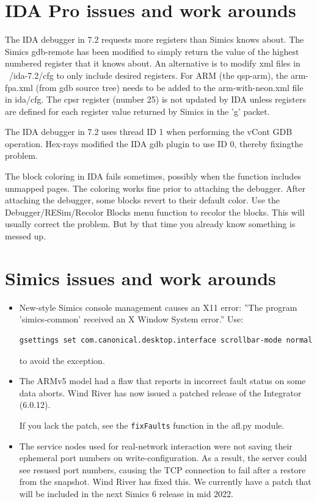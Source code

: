 \documentclass[titlepage]{article}
\begin{document}
\begin{appendices}
\section{IDA Pro issues and work arounds}
The IDA debugger in 7.2 requests more registers than Simics knows about.  The Simics gdb-remote has been modified
to simply return the value of the highest numbered register that it knows about.  An alternative is to modify
xml files in ~/ida-7.2/cfg to only include desired registers.   For ARM (the qsp-arm), the arm-fpa.xml (from gdb source
tree) needs to be added to the arm-with-neon.xml file in ida/cfg.  The cpsr register (number 25) is not updated by IDA
unless registers are defined for each register value returned by Simics in the 'g' packet.

The IDA debugger in 7.2 uses thread ID 1 when performing the vCont GDB operation.  Hex-rays modified the IDA gdb plugin to
use ID 0, thereby fixingthe problem.

The block coloring in IDA fails sometimes, possibly when the function includes unmapped pages.  The coloring works fine prior
to attaching the debugger.  After attaching the debugger, some blocks revert to their default color.  Use the Debugger/RESim/Recolor Blocks
menu function to recolor the blocks. 
This will usually correct the problem.  But by that time you already know something is messed up.

\section{Simics issues and work arounds}
\begin{itemize}
\item New-style Simics console management causes an X11 error: ''The program 'simics-common' received an X Window System error.''
Use:
\begin{verbatim}
gsettings set com.canonical.desktop.interface scrollbar-mode normal
\end{verbatim}
\noindent to avoid the exception.
\item The ARMv5 model had a flaw that reports in incorrect fault status on some data aborts.  Wind River has now issued a patched release
of the Integrator (6.0.12).

If you lack the patch, see the {\tt fixFaults} function in the afl.py module.

\item The service nodes used for real-network interaction were not saving their ephemeral port numbers on write-configuration.  As a result,
the server could see resused port numbers, causing the TCP connection to fail after a restore from the snapshot.  Wind River has fixed this.
We currently have a patch that will be included in the next Simics 6 release in mid 2022.
\end{itemize}


\end{appendices}
\end{document}
